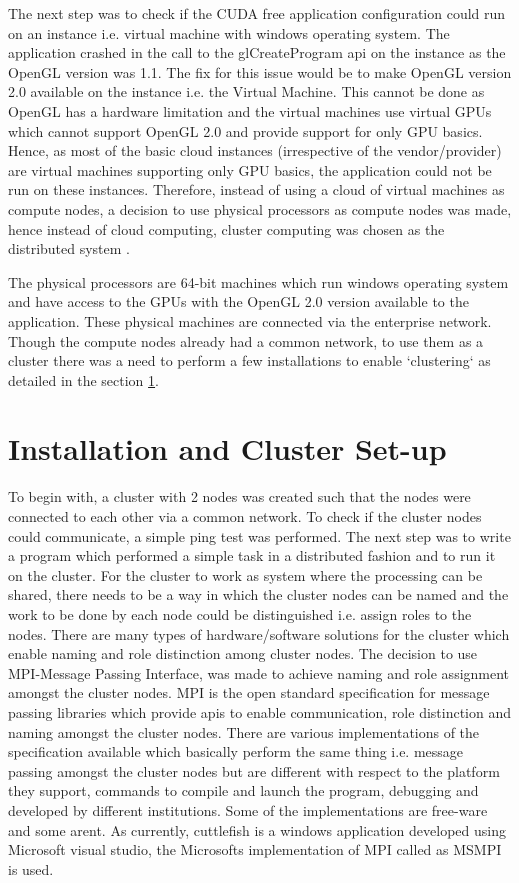 The next step was to check if the CUDA free application configuration could run on an instance i.e. virtual machine with windows operating system. The application crashed in the call to the glCreateProgram api on the instance as the OpenGL version was 1.1. The fix for this issue would be to make OpenGL version 2.0 available on the instance i.e. the Virtual Machine. This cannot be done as OpenGL has a hardware limitation and the virtual machines use virtual GPUs which cannot support OpenGL 2.0 and provide support for only GPU basics. Hence, as most of the basic cloud instances (irrespective of the vendor/provider) are virtual machines supporting only GPU basics, the application could not be run on these instances. Therefore, instead of using a cloud of virtual machines as compute nodes, a decision to use physical processors as compute nodes was made, hence instead of cloud computing, cluster computing was chosen as the distributed system . 

The physical processors are 64-bit machines which run windows operating system and have access to the GPUs with the OpenGL 2.0 version available to the application. These physical machines are connected via the enterprise network. Though the compute nodes already had a common network, to use them as a cluster there was a need to perform a few installations to enable `clustering` as detailed in the section \ref{ICS}. 


\section{Installation and Cluster Set-up} \label{ICS}

To begin with, a cluster with 2 nodes was created such that the nodes were connected to each other via a common network. To check if the cluster nodes could communicate, a simple ping test was performed. The next step was to write a program which performed a simple task in a distributed fashion and to run it on the cluster. For the cluster to work as system where the processing can be shared, there needs to be a way in which the cluster nodes can be named and the work to be done by each node could be distinguished i.e. assign roles to the nodes. There are many types of hardware/software solutions for the cluster which enable naming and role distinction among cluster nodes. The decision to use MPI-Message Passing Interface, was made to achieve naming and role assignment amongst the cluster nodes. MPI is the open standard specification for message passing libraries which provide apis to enable communication, role distinction and naming amongst the cluster nodes. There are various implementations of the specification available which basically perform the same thing i.e. message passing amongst the cluster nodes but are different with respect to the platform they support, commands to compile and launch the program, debugging and developed by different institutions. 
Some of the implementations are free-ware and some aren\textquotesingle t. As currently, cuttlefish is a windows application developed using Microsoft visual studio, the Microsoft\textquotesingle s implementation of MPI called as MSMPI is used. 

